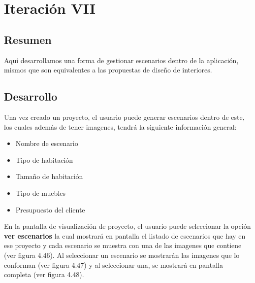 \section{Iteración VII}
\subsection{Resumen}
Aquí desarrollamos una forma de gestionar escenarios dentro de la aplicación, mismos que son equivalentes a las propuestas de diseño de interiores.

\subsection{Desarrollo}
Una vez creado un proyecto, el usuario puede generar escenarios dentro de este, los cuales además de tener imagenes, tendrá la siguiente información general:
\begin{itemize}
	\item Nombre de escenario
	\item Tipo de habitación
	\item Tamaño de habitación
	\item Tipo de muebles
	\item Presupuesto del cliente
\end{itemize}

En la pantalla de visualización de proyecto, el usuario puede seleccionar la opción \textbf{ver escenarios} la cual mostrará en pantalla el listado de escenarios que hay en ese proyecto y cada escenario se muestra con una de las imagenes que contiene (ver figura 4.46). Al seleccionar un escenario se mostrarán las imagenes que lo conforman (ver figura 4.47) y al seleccionar una, se mostrará en pantalla completa (ver figura 4.48). 

